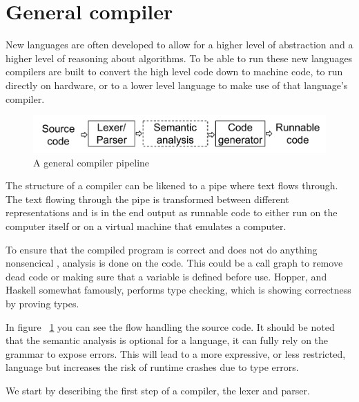 \section{General compiler}
New languages are often developed to allow for a higher level of abstraction and a higher level of reasoning about algorithms. To be able to run these new languages compilers are built to convert the high level code down to machine code, to run directly on hardware, or to a lower level language to make use of that language's compiler. 

\begin{figure}[!ht]
  \centering
  \includegraphics[width=0.6\pdfpagewidth]{figure/generalpipeline}
  \caption{A general compiler pipeline}
  \label{fig:generalpipeline}
\end{figure}

The structure of a compiler can be likened to a pipe where text flows through. 
The text flowing through the pipe is transformed between different representations and is in
the end output as runnable code to either run on the computer itself or on a virtual machine
that emulates a computer. 

To ensure that the compiled program is correct and does not do anything nonsencical , analysis is done on the code. This could be a call graph  to remove dead code or making sure that a variable is defined before use. Hopper, and Haskell somewhat famously, performs type checking, which is showing correctness by proving types.

In figure ~\ref{fig:generalpipeline} you can see the flow handling the source code.
It should be noted that the semantic analysis is optional for a language, it can
fully rely on the grammar to expose errors. This will lead to a more expressive, 
or less restricted, language but increases the risk of runtime crashes due to type errors.

We start by describing the first step of a compiler, the lexer and parser.
